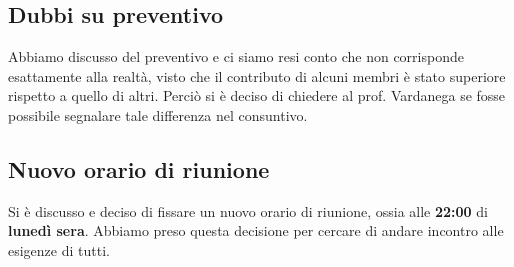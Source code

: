 \subsection{Dubbi su preventivo}
Abbiamo discusso del preventivo e ci siamo resi conto che non corrisponde esattamente alla realtà, visto che il contributo di alcuni membri è stato superiore rispetto a quello di altri. Perciò si è deciso di chiedere al prof. Vardanega se fosse possibile segnalare tale differenza nel consuntivo.

\subsection{Nuovo orario di riunione}
Si è discusso e deciso di fissare un nuovo orario di riunione, ossia alle \textbf{22:00} di \textbf{lunedì sera}. Abbiamo preso questa decisione per cercare di andare incontro alle esigenze di tutti.
